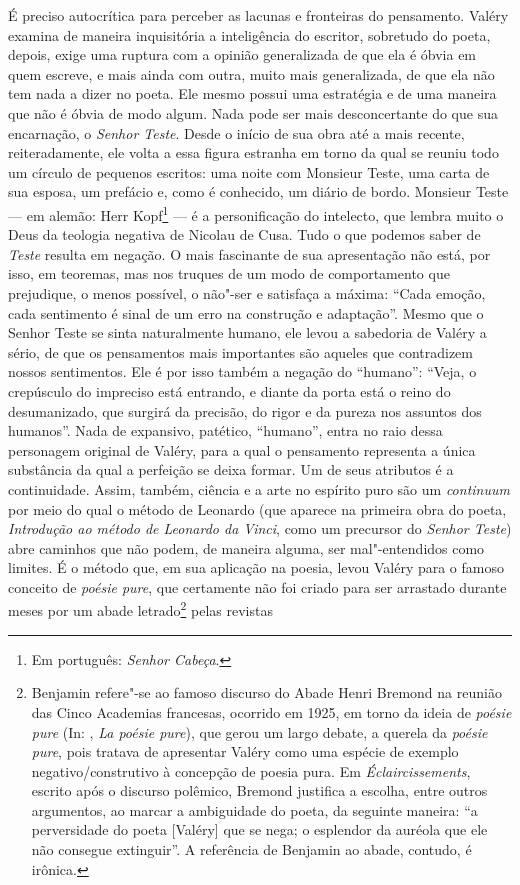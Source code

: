 É preciso autocrítica para perceber as lacunas e fronteiras do
pensamento. Valéry examina de maneira inquisitória a inteligência do
escritor, sobretudo do poeta, depois, exige uma ruptura com a opinião
generalizada de que ela é óbvia em quem escreve, e mais ainda com outra,
muito mais generalizada, de que ela não tem nada a dizer no poeta. Ele
mesmo possui uma estratégia e de uma maneira que não é óbvia de modo algum. Nada pode
ser mais desconcertante do que sua encarnação, o \emph{Senhor Teste}. %
Desde o início de sua obra até a mais recente, reiteradamente, ele volta
a essa figura estranha em torno da qual se reuniu todo um círculo de
pequenos escritos: uma noite com Monsieur Teste, uma carta de sua
esposa, um prefácio e, como é conhecido, um diário de bordo. Monsieur
Teste --- em alemão: Herr Kopf\footnote{Em português: \emph{Senhor
  Cabeça}. \versal{[N. T.]}} --- é a personificação do intelecto, que lembra muito o Deus
da teologia negativa de Nicolau de Cusa. Tudo o que podemos
saber de \emph{Teste} resulta em negação. O mais fascinante de sua
apresentação não está, por isso, em teoremas, mas nos truques de um modo
de comportamento que prejudique, o menos possível, o não"-ser e satisfaça
a máxima: ``Cada emoção, cada sentimento é sinal de um erro na construção
e adaptação''. Mesmo que o Senhor Teste se sinta naturalmente humano,
ele levou a sabedoria de Valéry a sério, de que os pensamentos mais
importantes são aqueles que contradizem nossos sentimentos. Ele é por
isso também a negação do ``humano'': ``Veja, o crepúsculo do impreciso está
entrando, e diante da porta está o reino do desumanizado, que surgirá
da precisão, do rigor e da pureza nos assuntos dos humanos''. Nada de
expansivo, patético, ``humano'', entra no raio dessa personagem original
de Valéry, para a qual o pensamento representa a única substância da
qual a perfeição se deixa formar. Um de seus atributos é a continuidade.
Assim, também, ciência e a arte no espírito puro são um \emph{continuum}
por meio do qual o método de Leonardo (que aparece na primeira obra do
poeta, \emph{Introdução ao método de Leonardo da Vinci}, como um precursor do
\emph{Senhor Teste}) abre caminhos que não podem, de maneira alguma, ser mal"-entendidos como limites. É o método que, em sua aplicação na poesia,
levou Valéry para o famoso conceito de \emph{poésie pure}, que
certamente não foi criado para ser arrastado durante meses por um abade
letrado\footnote{Benjamin refere"-se ao famoso discurso do Abade
  Henri Bremond na reunião das Cinco Academias francesas, ocorrido em
  1925, em torno da ideia de \emph{poésie pure} (In: , \emph{La
  poésie pure}), que gerou um largo debate, a querela da \emph{poésie
    pure}, pois tratava de apresentar Valéry como uma espécie de exemplo
  negativo/construtivo à concepção de poesia pura. Em
  \emph{Éclaircissements}, escrito após o discurso polêmico, Bremond
  justifica a escolha, entre outros argumentos, ao marcar a ambiguidade
  do poeta, da seguinte maneira: ``a perversidade do poeta {[}Valéry{]}
  que se nega; o esplendor da auréola que ele não consegue extinguir''.
  A referência de Benjamin ao abade, contudo, é irônica. \versal{[N. E.]}} pelas revistas
